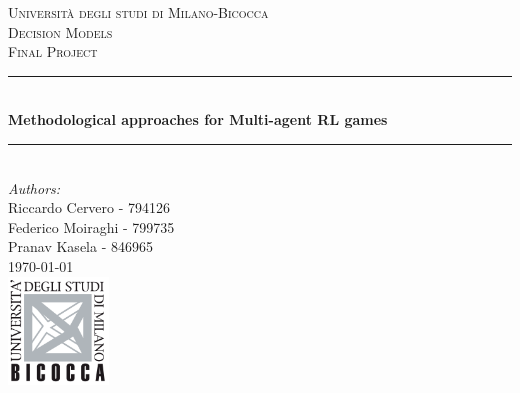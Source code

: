 \begin{titlepage}

\newcommand{\HRule}{\rule{\linewidth}{0.5mm}} %

\center %
 

\textsc{\LARGE Università degli studi di Milano-Bicocca}\\[1cm] %
\textsc{\Large Decision Models}\\[0.3cm] %
\textsc{\large Final Project}\\[0.1cm] %


\HRule \\[0.4cm]
{ \huge \bfseries Methodological approaches for Multi-agent RL games}\\[0.4cm] %
\HRule \\[1.5cm]
 

\large
\emph{Authors:}\\
Riccardo Cervero - 794126\\   
Federico Moiraghi - 799735\\ 
Pranav Kasela - 846965\\[1cm] 

{\large \today}\\[2cm] 


\includegraphics[width=0.2\textwidth]{./figs/logo.png}\\[1cm] 

\vfill %

\end{titlepage}


